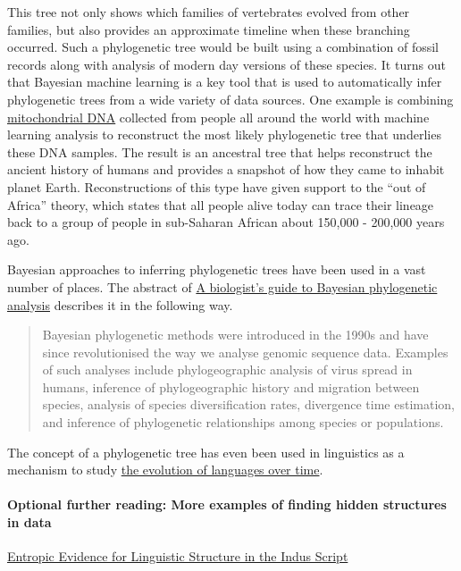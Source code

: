 \documentclass[assignment01_Solutions]{subfiles}
\begin{document}
This tree not only shows which families of vertebrates evolved from other families, but also provides an approximate timeline when these branching occurred.  Such a phylogenetic tree would be built using a combination of fossil records along with analysis of modern day versions of these species.  It turns out that Bayesian machine learning is a key tool that is used to automatically infer phylogenetic trees from a wide variety of data sources.  One example is combining \href{https://en.wikipedia.org/wiki/Mitochondrial_DNA}{mitochondrial DNA} collected from people all around the world with machine learning analysis to reconstruct the most likely phylogenetic tree that underlies these DNA samples.  The result is an ancestral tree that helps reconstruct the ancient history of humans and provides a snapshot of how they came to inhabit planet Earth.  Reconstructions of this type have given support to the ``out of Africa'' theory, which states that all people alive today can trace their lineage back to a group of people in sub-Saharan African about 150,000 - 200,000 years ago.

Bayesian approaches to inferring phylogenetic trees have been used in a vast number of places.  The abstract of \href{https://www.ncbi.nlm.nih.gov/pmc/articles/PMC5624502/}{A biologist’s guide to Bayesian phylogenetic analysis} describes it in the following way.
\begin{quote}
Bayesian phylogenetic methods were introduced in the 1990s and have since revolutionised the way we analyse genomic sequence data. Examples of such analyses include phylogeographic analysis of virus spread in humans, inference of phylogeographic history and migration between species, analysis of species diversification rates, divergence time estimation, and inference of phylogenetic relationships among species or populations.
\end{quote}

The concept of a phylogenetic tree has even been used in linguistics as a mechanism to study \href{https://journals.plos.org/plosone/article?id=10.1371/journal.pone.0180908}{the evolution of languages over time}.

\paragraph{Optional further reading: More examples of finding hidden structures in data}

\href{https://www.science.org/doi/full/10.1126/science.1170391}{Entropic Evidence for Linguistic Structure in the Indus Script}
\end{document}
